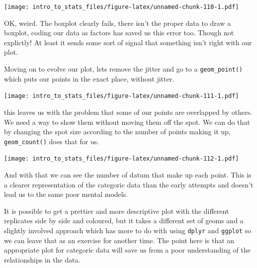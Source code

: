 \documentclass[
]{book}
\newenvironment{Shaded}{\begin{snugshade}}{\end{snugshade}}
\newcommand{\DataTypeTok}[1]{\textcolor[rgb]{0.13,0.29,0.53}{#1}}
\newcommand{\KeywordTok}[1]{\textcolor[rgb]{0.13,0.29,0.53}{\textbf{#1}}}
\newcommand{\NormalTok}[1]{#1}
\newcommand{\OperatorTok}[1]{\textcolor[rgb]{0.81,0.36,0.00}{\textbf{#1}}}
\newcommand{\StringTok}[1]{\textcolor[rgb]{0.31,0.60,0.02}{#1}}
\begin{document}
\texttt{[image: intro\_to\_stats\_files/figure-latex/unnamed-chunk-110-1.pdf]}

OK, weird. The boxplot clearly fails, there isn't the proper data to draw a boxplot, coding our data as factors has saved us this error too. Though not explictly! At least it sends some sort of signal that something isn't right with our plot.

Moving on to evolve our plot, lets remove the jitter and go to a \texttt{geom\_point()} which puts our points in the exact place, without jitter.

\begin{Shaded}
\end{Shaded}

\texttt{[image: intro\_to\_stats\_files/figure-latex/unnamed-chunk-111-1.pdf]}

this leaves us with the problem that some of our points are overlapped by others. We need a way to show them without moving them off the spot. We can do that by changing the spot size according to the number of points making it up, \texttt{geom\_count()} does that for us.

\begin{Shaded}
\end{Shaded}

\texttt{[image: intro\_to\_stats\_files/figure-latex/unnamed-chunk-112-1.pdf]}

And with that we can see the number of datum that make up each point. This is a clearer representation of the categoric data than the early attempts and doesn't lead us to the same poor mental models.

It is possible to get a prettier and more descriptive plot with the different replicates side by side and coloured, but it takes a different set of geoms and a slightly involved approach which has more to do with using \texttt{dplyr} and \texttt{ggplot} so we can leave that as an exercise for another time. The point here is that an appropriate plot for categoric data will save us from a poor understanding of the relationships in the data.
\end{document}
